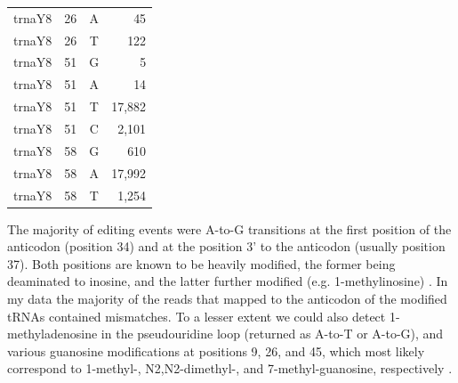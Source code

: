 \documentclass[12pt]{rockefeller}
\begin{document}
{\begin{center}
\begin{supertabular}{|l|r|c|r|}
  trnaY8 &        26 &          A &         45 \\
  trnaY8 &        26 &          T &        122 \\
  trnaY8 &        51 &          G &          5 \\
  trnaY8 &        51 &          A &         14 \\
  trnaY8 &        51 &          T &     17,882 \\
  trnaY8 &        51 &          C &      2,101 \\
  trnaY8 &        58 &          G &        610 \\
  trnaY8 &        58 &          A &     17,992 \\
  trnaY8 &        58 &          T &      1,254 \\
\hline
\end{supertabular}%
\end{center}
\pagebreak
}
\onecolumn

The majority of editing events were A-to-G transitions at the first position of the anticodon (position 34) and at the position 3’ to the anticodon (usually position 37). Both positions are known to be heavily modified, the former being deaminated to inosine, and the latter further modified (e.g. 1-methylinosine) \cite{Machnicka:2013ky}. In my data the majority of the reads that mapped to the anticodon of the modified tRNAs contained mismatches. To a lesser extent we could also detect 1-methyladenosine in the pseudouridine loop (returned as A-to-T or A-to-G), and various guanosine modifications at positions 9, 26, and 45, which most likely correspond to 1-methyl-, N2,N2-dimethyl-, and 7-methyl-guanosine, respectively \cite{Machnicka:2013ky}.
\end{document}
